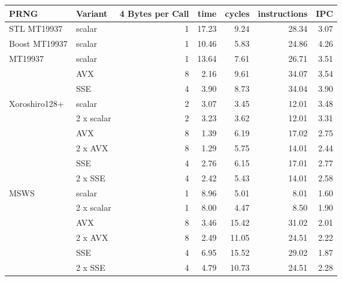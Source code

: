 \documentclass{stdlocal}
\begin{document}
\begin{tabular}{llrrrrr}
  \hline
  PRNG & Variant & 4 Bytes per Call & time & cycles & instructions & IPC \\
  \hline
  \hline
  STL MT19937
  & scalar & 1 & 17.23 & 9.24 & 28.34 & 3.07 \\
  \hline
  Boost MT19937
  & scalar & 1 & 10.46 & 5.83 & 24.86 & 4.26 \\
  \hline
  \multirow{3}{*}{MT19937}
  & scalar & 1 & 13.64 & 7.61 & 26.71 & 3.51 \\
  & AVX & 8 & 2.16 & 9.61 & 34.07 & 3.54 \\
  & SSE & 4 & 3.90 & 8.73 & 34.04 & 3.90 \\
  \hline
  \multirow{6}{*}{Xoroshiro128+}
  & scalar & 2 & 3.07 & 3.45 & 12.01 & 3.48 \\
  & 2 x scalar & 2 & 3.23 & 3.62 & 12.01 & 3.31 \\
  & AVX & 8 & 1.39 & 6.19 & 17.02 & 2.75 \\
  & 2 x AVX & 8 & 1.29 & 5.75 & 14.01 & 2.44 \\
  & SSE & 4 & 2.76 & 6.15 & 17.01 & 2.77 \\
  & 2 x SSE & 4 & 2.42 & 5.43 & 14.01 & 2.58 \\
  \hline
  \multirow{6}{*}{MSWS}
  & scalar & 1 & 8.96 & 5.01 & 8.01 & 1.60 \\
  & 2 x scalar & 1 & 8.00 & 4.47 & 8.50 & 1.90 \\
  & AVX & 8 & 3.46 & 15.42 & 31.02 & 2.01 \\
  & 2 x AVX & 8 & 2.49 & 11.05 & 24.51 & 2.22 \\
  & SSE & 4 & 6.95 & 15.52 & 29.02 & 1.87 \\
  & 2 x SSE & 4 & 4.79 & 10.73 & 24.51 & 2.28 \\
  \hline
\end{tabular}
\end{document}
